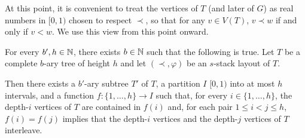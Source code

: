 \documentclass[kpfonts]{patmorin}
\begin{document}
At this point, it is convenient to treat the vertices of $T$ (and later of $G$) as real numbers in $[0,1)$ chosen to respect $\prec$, so that for any $v\in V(T)$, $v\prec w$ if and only if $v < w$.  We use this view from this point onward.








\begin{lem}
  For every $b',h\in\mathbb{N}$, there exists $b\in\mathbb{N}$ such that the following is true.
  Let $T$ be a complete $b$-ary tree of height $h$ and let $(\prec,\varphi)$ be an $s$-stack layout of $T$.  
  
  Then there exists a $b'$-ary subtree $T'$ of $T$, a partition $I$ $[0,1)$ into at most $h$ intervals, and a function $f:\{1,\ldots,h\}\to I$ such that,
  for every $i\in\{1,\ldots,h\}$, the depth-$i$ vertices of $T$ are contained in $f(i)$ and, for each pair $1\le i < j\le h$, $f(i)=f(j)$ implies that the depth-$i$ vertices and the depth-$j$ vertices of $T$ interleave.
\end{lem}
\end{document}
